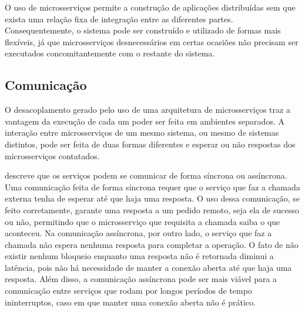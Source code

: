 O uso de microsserviços permite a construção de aplicações distribuídas sem que exista uma relação fixa de integração entre as diferentes partes. Consequentemente, o sistema pode ser construído e utilizado de formas mais flexíveis, já que microsserviços desnecessários em certas ocasiões não precisam ser executados concomitantemente com o restante do sistema. 

\subsection{Comunicação}
\label{sec:servicecom}

O desacoplamento gerado pelo uso de uma arquitetura de microsserviços traz a vantagem da execução de cada um poder ser feita em ambientes separados. A interação entre microsserviços de um mesmo sistema, ou mesmo de sistemas distintos, pode ser feita de duas formas diferentes e esperar ou não respostas dos microsserviços contatados. 



\cite{Newman:2015:BM:2904388} descreve que os serviços podem se comunicar de forma síncrona ou assíncrona. Uma comunicação feita de forma síncrona requer que o serviço que faz a chamada externa tenha de esperar até que haja uma resposta. O uso dessa comunicação, se feito corretamente, garante uma resposta a um pedido remoto, seja ela de sucesso ou não, permitindo que o microsserviço que requisita a chamada saiba o que aconteceu. Na comunicação assíncrona, por outro lado, o serviço que faz a chamada não espera nenhuma resposta para completar a operação. O fato de não existir nenhum bloqueio enquanto uma resposta não é retornada diminui a latência, pois não há necessidade de manter a conexão aberta até que haja uma resposta. Além disso, a comunicação assíncrona pode ser mais viável para a comunicação entre serviços que rodam por longos períodos de tempo ininterruptos, caso em que manter uma conexão aberta não é prático. 

